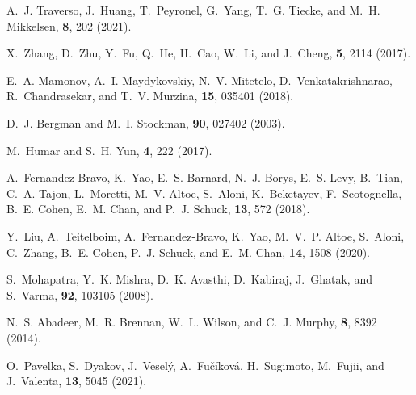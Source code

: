\documentclass[9pt,twocolumn,twoside]{osajnl}
\begin{document}
\begin{thebibliography}{10}
A.~J. Traverso, J.~Huang, T.~Peyronel, G.~Yang, T.~G. Tiecke, and M.~H.
  Mikkelsen, {\protect{}} \textbf{8}, 202 (2021).

X.~Zhang, D.~Zhu, Y.~Fu, Q.~He, H.~Cao, W.~Li, and J.~Cheng,
  {\protect{}} \textbf{5}, 2114
  (2017).

E.~A. Mamonov, A.~I. Maydykovskiy, N.~V. Mitetelo, D.~Venkatakrishnarao,
  R.~Chandrasekar, and T.~V. Murzina, {\protect{}} \textbf{15}, 035401 (2018).

D.~J. Bergman and M.~I. Stockman, {\protect{}} \textbf{90}, 027402 (2003).

M.~Humar and S.~H. Yun, {\protect{}} \textbf{4}, 222 (2017).

A.~Fernandez-Bravo, K.~Yao, E.~S. Barnard, N.~J. Borys, E.~S. Levy, B.~Tian,
  C.~A. Tajon, L.~Moretti, M.~V. Altoe, S.~Aloni, K.~Beketayev, F.~Scotognella,
  B.~E. Cohen, E.~M. Chan, and P.~J. Schuck, {\protect{}} \textbf{13}, 572 (2018).

Y.~Liu, A.~Teitelboim, A.~Fernandez-Bravo, K.~Yao, M.~V.~P. Altoe, S.~Aloni,
  C.~Zhang, B.~E. Cohen, P.~J. Schuck, and E.~M. Chan,
  {\protect{}} \textbf{14}, 1508 (2020).

S.~Mohapatra, Y.~K. Mishra, D.~K. Avasthi, D.~Kabiraj, J.~Ghatak, and S.~Varma,
  {\protect{}} \textbf{92}, 103105 (2008).

N.~S. Abadeer, M.~R. Brennan, W.~L. Wilson, and C.~J. Murphy,
  {\protect{}} \textbf{8}, 8392 (2014).

O.~Pavelka, S.~Dyakov, J.~Vesel{\'{y}}, A.~Fu{\v{c}}{\'{i}}kov{\'{a}},
  H.~Sugimoto, M.~Fujii, and J.~Valenta, {\protect{}}
  \textbf{13}, 5045 (2021).

\end{thebibliography}
\end{document}
